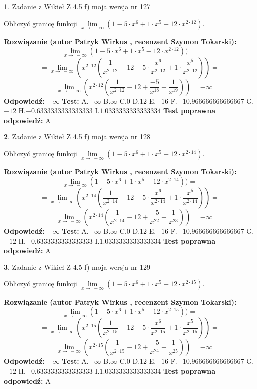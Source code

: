 \documentclass[12pt, a4paper]{article}
\theoremstyle{definition} %
\newtheorem{zad}{}
\newcommand{\zadStart}[1]{\begin{zad}#1\newline}
\newcommand{\zadStop}{\end{zad}}
\newcommand{\rozwStart}[2]{\noindent \textbf{Rozwiązanie (autor #1 , recenzent #2): }\newline}
\newcommand{\rozwStop}{\newline}
\newcommand{\odpStart}{\noindent \textbf{Odpowiedź:}\newline}
\newcommand{\odpStop}{\newline}
\newcommand{\testStart}{\noindent \textbf{Test:}\newline}
\newcommand{\testStop}{\newline}
\newcommand{\kluczStart}{\noindent \textbf{Test poprawna odpowiedź:}\newline}
\newcommand{\kluczStop}{\newline}
\begin{document}
\zadStart{Zadanie z Wikieł Z 4.5 f) moja wersja nr 127}


Obliczyć granicę funkcji  $\lim\limits_{x\to\ -\infty}(1 - 5 \cdot x^{6}+1 \cdot x^{5}- 12 \cdot x^{2\cdot12})$.
\zadStop
\rozwStart{Patryk Wirkus}{Szymon Tokarski}
$$\lim\limits_{x\to\ -\infty}(1 - 5 \cdot x^{6}+1 \cdot x^{5}- 12 \cdot x^{2\cdot12}))=$$
$$=\lim\limits_{x\to\ -\infty}(x^{2\cdot12}(\frac{1}{x^{2\cdot12}}-12 -5 \cdot \frac{x^{6}}{x^{2\cdot12}}+1 \cdot \frac{x^{5}}{x^{2\cdot12}}))=$$
$$=\lim\limits_{x\to\ -\infty}(x^{2\cdot12}(\frac{1}{x^{2\cdot12}}-12 + \frac{-5}{x^{18}}+ \frac{1}{x^{19}}))=-\infty$$
\rozwStop
\odpStart
$-\infty$
\odpStop
\testStart
A.$-\infty$ B.$\infty$ C.$0$ D.$12$ E.$-16$
F.$-10.966666666666667$ G.$-12$
H.$-0.6333333333333333$
I.$1.0333333333333334$
\testStop
\kluczStart
A
\kluczStop



\zadStart{Zadanie z Wikieł Z 4.5 f) moja wersja nr 128}


Obliczyć granicę funkcji  $\lim\limits_{x\to\ -\infty}(1 - 5 \cdot x^{6}+1 \cdot x^{5}- 12 \cdot x^{2\cdot14})$.
\zadStop
\rozwStart{Patryk Wirkus}{Szymon Tokarski}
$$\lim\limits_{x\to\ -\infty}(1 - 5 \cdot x^{6}+1 \cdot x^{5}- 12 \cdot x^{2\cdot14}))=$$
$$=\lim\limits_{x\to\ -\infty}(x^{2\cdot14}(\frac{1}{x^{2\cdot14}}-12 -5 \cdot \frac{x^{6}}{x^{2\cdot14}}+1 \cdot \frac{x^{5}}{x^{2\cdot14}}))=$$
$$=\lim\limits_{x\to\ -\infty}(x^{2\cdot14}(\frac{1}{x^{2\cdot14}}-12 + \frac{-5}{x^{22}}+ \frac{1}{x^{23}}))=-\infty$$
\rozwStop
\odpStart
$-\infty$
\odpStop
\testStart
A.$-\infty$ B.$\infty$ C.$0$ D.$12$ E.$-16$
F.$-10.966666666666667$ G.$-12$
H.$-0.6333333333333333$
I.$1.0333333333333334$
\testStop
\kluczStart
A
\kluczStop



\zadStart{Zadanie z Wikieł Z 4.5 f) moja wersja nr 129}


Obliczyć granicę funkcji  $\lim\limits_{x\to\ -\infty}(1 - 5 \cdot x^{6}+1 \cdot x^{5}- 12 \cdot x^{2\cdot15})$.
\zadStop
\rozwStart{Patryk Wirkus}{Szymon Tokarski}
$$\lim\limits_{x\to\ -\infty}(1 - 5 \cdot x^{6}+1 \cdot x^{5}- 12 \cdot x^{2\cdot15}))=$$
$$=\lim\limits_{x\to\ -\infty}(x^{2\cdot15}(\frac{1}{x^{2\cdot15}}-12 -5 \cdot \frac{x^{6}}{x^{2\cdot15}}+1 \cdot \frac{x^{5}}{x^{2\cdot15}}))=$$
$$=\lim\limits_{x\to\ -\infty}(x^{2\cdot15}(\frac{1}{x^{2\cdot15}}-12 + \frac{-5}{x^{24}}+ \frac{1}{x^{25}}))=-\infty$$
\rozwStop
\odpStart
$-\infty$
\odpStop
\testStart
A.$-\infty$ B.$\infty$ C.$0$ D.$12$ E.$-16$
F.$-10.966666666666667$ G.$-12$
H.$-0.6333333333333333$
I.$1.0333333333333334$
\testStop
\kluczStart
A
\kluczStop
\end{document}
